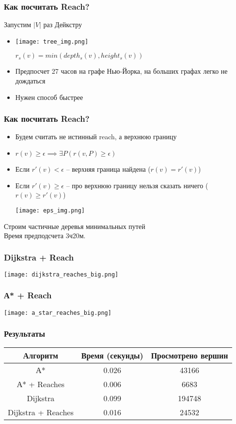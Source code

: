 \documentclass[10pt, pdf,utf8,russian]{beamer}
\begin{document}
\begin{frame}
\frametitle{Как посчитать Reach?}
Запустим $|V|$ раз Дейкстру
\begin{itemize}
	\item 
		\begin{center}
		\texttt{[image: tree\_img.png]}
		\end{center}
		$r_s(v) = min(depth_s(v),height_s(v))$
	\item Предпосчет 27 часов на графе Нью-Йорка, на больших графах легко не дождаться
	\item Нужен способ быстрее
\end{itemize}
\end{frame}

\begin{frame}
\frametitle{Как посчитать Reach?}
\begin{itemize}
	\item 
		Будем считать не истинный reach, а верхнюю границу
	\item 
		$r(v) \geq \epsilon \implies \exists P (r(v,P) \geq \epsilon)$
	\item 
		Если $r'(v) < \epsilon$ -- верхняя граница найдена ($r(v) = r'(v)$)
	\item 
		Если $r'(v) \geq \epsilon$ -- про верхнюю границу нельзя сказать ничего ($r(v) \geq r'(v)$)
		\begin{center}
			\texttt{[image: eps\_img.png]}
		\end{center} 
\end{itemize}
Строим частичные деревья минимальных путей\\
Время предподсчета 3ч20м.
\end{frame}

\begin{frame}
\frametitle{Dijkstra + Reach}
\begin{center}
	\texttt{[image: dijkstra\_reaches\_big.png]}
\end{center} 
\end{frame}

\begin{frame}
\frametitle{А* + Reach}
\begin{center}
	\texttt{[image: a\_star\_reaches\_big.png]}
\end{center} 
\end{frame}

\begin{frame}
\frametitle{Результаты}
	\begin{tabular}{|c|c|c|} Алгоритм & Время (секунды) & Просмотрено вершин \\
		\hline
		А*&0.026&43166\\
		А* + Reaches&0.006&6683\\
		Dijkstra&0.099&194748\\
		Dijkstra + Reaches&0.016&24532\\
	\end{tabular}
\end{frame}
\end{document}
